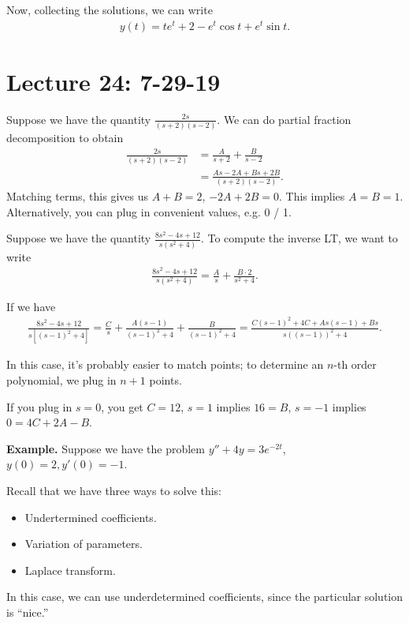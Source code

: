 \documentclass{article}
\begin{document}
Now, collecting the solutions, we can write
\begin{align*}
  y(t) = t e^t + 2 - e^t \cos t + e^t \sin t.
\end{align*}

\section{Lecture 24: 7-29-19}

Suppose we have the quantity $\frac{2s}{(s+2)(s-2)}$.  We can do partial fraction decomposition to obtain
\begin{align*}
  \frac{2s}{(s+2)(s-2)} &= \frac{A}{s+2} + \frac{B}{s-2} \\
  &= \frac{As - 2A + Bs + 2B}{(s+2)(s-2)}.
\end{align*}
Matching terms, this gives us $A+B = 2$, $-2A + 2B = 0$.  This implies $A = B = 1$.  Alternatively, you can plug in convenient values, e.g. 0 / 1.

Suppose we have the quantity $\frac{8s^2 - 4s + 12}{s(s^2+4)}$.  To compute the inverse LT, we want to write
\begin{align*}
  \frac{8s^2 - 4s + 12}{s(s^2+4)} = \frac{A}{s} + \frac{B \cdot 2}{s^2 + 4}.
\end{align*}

If we have
\begin{align*}
  \frac{8s^2 - 4s + 12}{s\left[ (s-1)^2 + 4 \right]} = \frac{C}{s}  + \frac{A(s-1)}{(s-1)^2 + 4} + \frac{B}{(s-1)^2 + 4} = \frac{C(s-1)^2 + 4C + As (s-1) + Bs}{s\left( (s-1) \right)^2 + 4}.
\end{align*}

In this case, it's probably easier to match points; to determine an $n$-th order polynomial, we plug in $n+1$ points.

If you plug in $s = 0$, you get $C = 12$, $s = 1$ implies $16 = B$, $s = -1$ implies  $0 = 4C + 2A - B$.

{\bf Example.} Suppose we have the problem $y'' + 4y = 3e^{-2t}$, $y(0) = 2, y'(0) = -1$.

Recall that we have three ways to solve this:

\begin{itemize}
  \item Undertermined coefficients.
  \item Variation of parameters.
  \item Laplace transform.
\end{itemize}

In this case, we can use underdetermined coefficients, since the particular solution is ``nice.''
\end{document}
